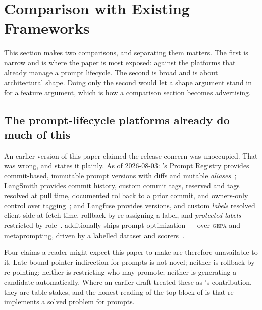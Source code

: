 \section{Comparison with Existing Frameworks}
\label{sec:compare}




This section makes two comparisons, and separating them matters. The first is
narrow and is where the paper is most exposed: against the platforms that already
manage a prompt lifecycle. The second is broad and is about architectural shape.
Doing only the second would let a shape argument stand in for a feature argument,
which is how a comparison section becomes advertising.

\subsection{The prompt-lifecycle platforms already do much of this}
\label{sec:compare:platforms}

An earlier version of this paper claimed the release concern was unoccupied. That
was wrong, and  states it plainly. As of 2026-08-03:
\mlflow{}'s Prompt Registry provides commit-based, immutable prompt versions with
diffs and mutable \emph{aliases}~\cite{mlflowpromptregistry}; LangSmith provides
commit history, custom commit tags, reserved  and 
tags resolved at pull time, documented rollback to a prior commit, and owners-only
control over tagging~\cite{langsmithprompts}; and Langfuse provides versions,
 and custom \emph{labels} resolved client-side at fetch time,
rollback by re-assigning a label, and \emph{protected labels} restricted by
role~\cite{langfuseprompts}. \mlflow{} additionally ships prompt optimization ---
 over \textsc{gepa} and metaprompting, driven by a
labelled dataset and scorers~\cite{mlflowoptimize}.

Four claims a reader might expect this paper to make are therefore unavailable to
it. Late-bound pointer indirection for prompts is not novel; neither is rollback by
re-pointing; neither is restricting who may promote; neither is generating a
candidate automatically. Where an earlier draft treated these as \sys's
contribution, they are table stakes, and the honest reading of the top block of
 is that \sys re-implements a solved problem for prompts.

